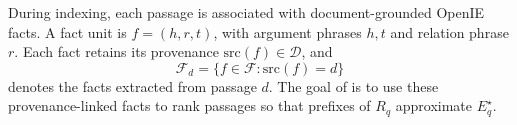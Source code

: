 During indexing, each passage is associated with
document-grounded OpenIE facts. A fact unit is $f=(h,r,t)$, with
argument phrases $h, t$ and relation phrase $r$. Each fact
retains its provenance $\mathrm{src}(f)\in\mathcal{D}$, and
\[
\mathcal{F}_d=\{f\in\mathcal{F}: \mathrm{src}(f)=d\}
\]
denotes the facts extracted from passage $d$. The goal of
\methodname{} is to use these provenance-linked facts to rank
passages so that prefixes of $R_q$ approximate $E_q^{\star}$.

